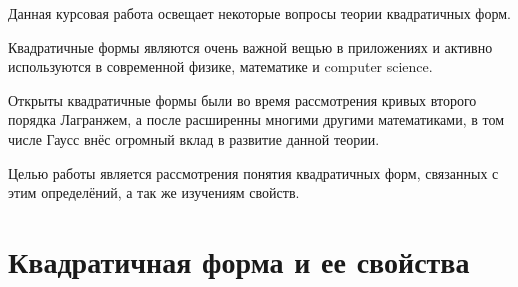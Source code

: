 \documentclass[bachelor, och, coursework, times]{SCWorks}
\author{Sharov Alex}
\begin{document}
%









\chtitle{} 
\chname{}  

\satitle{} 
\saname{}  

\patitle{} 
\paname{}  

\term{} 

\duration{} 

\practStart{}  
\practFinish{} 

\MakeTitle




\setcounter{tocdepth}{1}

\tableofcontents

\intro
Данная курсовая работа освещает некоторые вопросы теории квадратичных форм.

Квадратичные формы являются очень важной вещью в приложениях и активно используются в современной физике, математике и computer science.

Открыты квадратичные формы были во время рассмотрения кривых второго порядка Лагранжем, а после расширенны многими другими математиками, в том числе Гаусс внёс огромный вклад в развитие данной теории. 

Целью работы является рассмотрения понятия квадратичных форм, связанных с этим определёний, а так же изучениям свойств. 

\section{Квадратичная форма и ее свойства}
\end{document}
